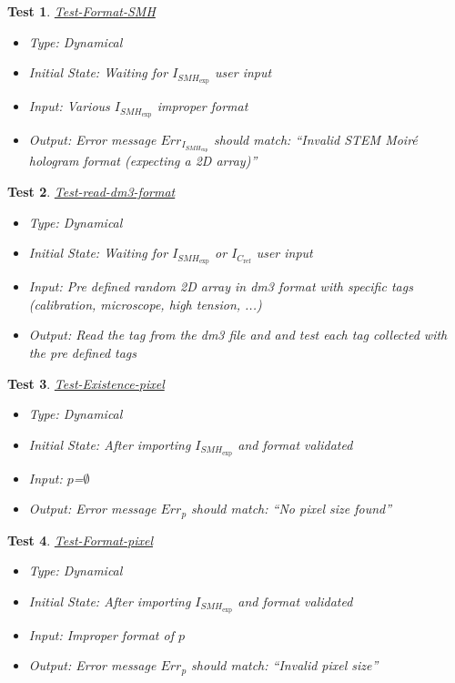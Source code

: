 \documentclass[12pt, titlepage]{article}
\newtheorem{Test}{Test}
\begin{document}
\begin{Test}\normalfont\underline{Test-Format-SMH}
\begin{itemize}
\item Type: Dynamical
\item Initial State: Waiting for $I_{\mathit{SMH}_{\text{exp}}}$ user input
\item Input: Various $I_{\mathit{SMH}_{\text{exp}}}$ improper format
\item Output: Error message $Err_{I_{\mathit{SMH}_{\text{exp}}}}$ should match: \enquote{Invalid STEM Moir{\'e} hologram format (expecting a 2D array)}
\end{itemize}
\end{Test}

\begin{Test}\normalfont\underline{Test-read-dm3-format}
\begin{itemize}
\item Type: Dynamical
\item Initial State: Waiting for $I_{\mathit{SMH}_{\text{exp}}}$ or $I_{C_{\text{ref}}}$ user input
\item Input: Pre defined random 2D array in dm3 format with specific tags (calibration, microscope, high tension, ...)
\item Output: Read the tag from the dm3 file and and test each tag collected with the pre defined tags
\end{itemize}
\end{Test}

\begin{Test}\normalfont\underline{Test-Existence-pixel}
\begin{itemize}
\item Type: Dynamical
\item Initial State: After importing $I_{\mathit{SMH}_{\text{exp}}}$ and format validated
\item Input: $p$=$\emptyset$
\item Output: Error message $Err_{p}$ should match: \enquote{No pixel size found}
\end{itemize}
\end{Test}

\begin{Test}\normalfont\underline{Test-Format-pixel}
\begin{itemize}
\item Type: Dynamical
\item Initial State: After importing $I_{\mathit{SMH}_{\text{exp}}}$ and format validated
\item Input: Improper format of $p$
\item Output: Error message $Err_{p}$ should match: \enquote{Invalid pixel size}
\end{itemize}
\end{Test}
\end{document}

